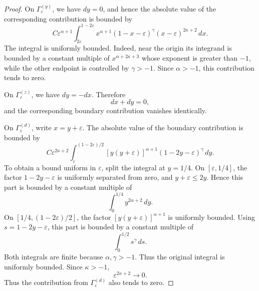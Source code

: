 \documentclass[reqno,10pt]{amsart}
\theoremstyle{plain}
\numberwithin{equation}{section}
\numberwithin{figure}{section}
\begin{document}
\begin{proof}
On \(\Gamma_\varepsilon^{(y)}\), we have \(dy=0\), and hence the
absolute value of the corresponding contribution is bounded by
\[
C\varepsilon^{\alpha+1}
\int_{2\varepsilon}^{1-2\varepsilon}
x^{\alpha+1}
(1-x-\varepsilon)^\gamma
(x-\varepsilon)^{2\kappa+2}\,dx.
\]
The integral is uniformly bounded. Indeed, near the origin its
integrand is bounded by a constant multiple of
\(
x^{\alpha+2\kappa+3}
\)
whose exponent is greater than \(-1\), while the other endpoint is
controlled by \(\gamma>-1\). Since \(\alpha>-1\), this contribution
tends to zero.

On \(\Gamma_\varepsilon^{(z)}\), we have \(dy=-dx\). Therefore
\[
dx+dy=0,
\]
and the corresponding boundary contribution vanishes identically.

On \(\Gamma_\varepsilon^{(d)}\), write
\(
x=y+\varepsilon
\). The absolute value of the boundary contribution is bounded by
\[
C\varepsilon^{2\kappa+2}
\int_{\varepsilon}^{(1-2\varepsilon)/2}
[y(y+\varepsilon)]^{\alpha+1}
(1-2y-\varepsilon)^\gamma\,dy.
\]
To obtain a bound uniform in \(\varepsilon\), split the integral at
\(y=1/4\). On \([\varepsilon,1/4]\), the factor
\(1-2y-\varepsilon\) is uniformly separated from zero, and
\(y+\varepsilon\leq2y\). Hence this part is bounded by a constant
multiple of
\[
\int_0^{1/4} y^{2\alpha+2}\,dy.
\]
On \([1/4,(1-2\varepsilon)/2]\), the factor
\([y(y+\varepsilon)]^{\alpha+1}\) is uniformly bounded. Using
\(s=1-2y-\varepsilon\), this part is bounded by a constant multiple of
\[
\int_0^{1/2}s^\gamma\,ds.
\]
Both integrals are finite because \(\alpha,\gamma>-1\). Thus the
original integral is uniformly bounded. Since
\(\kappa>-1\),
\[
\varepsilon^{2\kappa+2}\longrightarrow0.
\]
Thus the contribution from
\(\Gamma_\varepsilon^{(d)}\) also tends to zero.
\end{proof}
\end{document}
